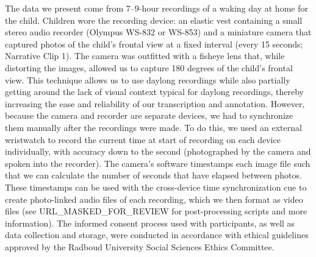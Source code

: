 \documentclass[,man,mask,floatsintext]{apa6}
\begin{document}
The data we present come from 7--9-hour recordings of a waking day at
home for the child. Children wore the recording device: an elastic vest
containing a small stereo audio recorder (Olympus WS-832 or WS-853) and
a miniature camera that captured photos of the child's frontal view at a
fixed interval (every 15 seconds; Narrative Clip 1). The camera was
outfitted with a fisheye lens that, while distorting the images, allowed
us to capture 180 degrees of the child's frontal view. This technique
allows us to use daylong recordings while also partially getting around
the lack of visual context typical for daylong recordings, thereby
increasing the ease and reliability of our transcription and annotation.
However, because the camera and recorder are separate devices, we had to
synchronize them manually after the recordings were made. To do this, we
used an external wristwatch to record the current time at start of
recording on each device individually, with accuracy down to the second
(photographed by the camera and spoken into the recorder). The camera's
software timestamps each image file such that we can calculate the
number of seconds that have elapsed between photos. These timestamps can
be used with the cross-device time synchronization cue to create
photo-linked audio files of each recording, which we then format as
video files (see URL\_MASKED\_FOR\_REVIEW for post-processing scripts
and more information). The informed consent process used with
participants, as well as data collection and storage, were conducted in
accordance with ethical guidelines approved by the Radboud University
Social Sciences Ethics Committee.
\end{document}
